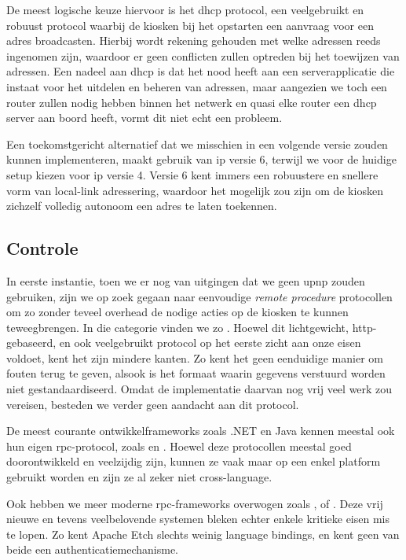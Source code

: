 De meest logische keuze hiervoor is het \ac{dhcp} protocol, een veelgebruikt en robuust protocol waarbij de kiosken bij het opstarten een aanvraag voor een adres broadcasten. Hierbij wordt rekening gehouden met welke adressen reeds ingenomen zijn, waardoor er geen conflicten zullen optreden bij het toewijzen van adressen. Een nadeel aan \ac{dhcp} is dat het nood heeft aan een serverapplicatie die instaat voor het uitdelen en beheren van adressen, maar aangezien we toch een router zullen nodig hebben binnen het netwerk en quasi elke router een \ac{dhcp} server aan boord heeft, vormt dit niet echt een probleem.

Een toekomstgericht alternatief dat we misschien in een volgende versie zouden kunnen implementeren, maakt gebruik van \ac{ip} versie 6, terwijl we voor de huidige setup kiezen voor \ac{ip} versie 4. Versie 6 kent immers een robuustere en snellere vorm van local-link adressering, waardoor het mogelijk zou zijn om de kiosken zichzelf volledig autonoom een adres te laten toekennen.

\subsection{Controle}

In eerste instantie, toen we er nog van uitgingen dat we geen \ac{upnp} zouden gebruiken, zijn we op zoek gegaan naar eenvoudige \emph{remote procedure} protocollen om zo zonder teveel overhead de nodige acties op de kiosken te kunnen teweegbrengen. In die categorie vinden we zo . Hoewel dit lichtgewicht, \ac{http}-gebaseerd, en ook veelgebruikt protocol op het eerste zicht aan onze eisen voldoet, kent het zijn mindere kanten. Zo kent het geen eenduidige manier om fouten terug te geven, alsook is het formaat waarin gegevens verstuurd worden niet gestandaardiseerd. Omdat de implementatie daarvan nog vrij veel werk zou vereisen, besteden we verder geen aandacht aan dit protocol.

De meest courante ontwikkelframeworks zoals .NET en Java kennen meestal ook hun eigen \ac{rpc}-protocol, zoals  en . Hoewel deze protocollen meestal goed doorontwikkeld en veelzijdig zijn, kunnen ze vaak maar op een enkel platform gebruikt worden en zijn ze al zeker niet cross-language.

Ook hebben we meer moderne \ac{rpc}-frameworks overwogen zoals , of . Deze vrij nieuwe en tevens veelbelovende systemen bleken echter enkele kritieke eisen mis te lopen. Zo kent Apache Etch slechts weinig language bindings, en kent geen van beide een authenticatiemechanisme.

